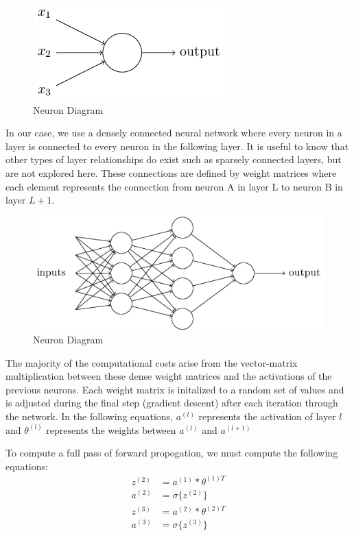 \documentclass[11pt]{article}
\begin{document}
\begin{figure}[H]
	\centering
	\includegraphics[scale=.5]{nn0.png}
	\caption{Neuron Diagram}
\end{figure}

In our case, we use a densely connected neural network where every neuron in a layer is connected to every neuron in the following layer. It is useful to know that other types of layer relationships do exist such as sparsely connected layers, but are not explored here. These connections are defined by weight matrices where each element represents the connection from neuron A in layer L to neuron B in layer $L+1$.

\begin{figure}[H]
	\centering
	\includegraphics[width=.45\textwidth]{nn1.png}
	\caption{Neuron Diagram}
\end{figure}

The majority of the computational costs arise from the vector-matrix multiplication between these dense weight matrices and the activations of the previous neurons. Each weight matrix is initalized to a random set of values and is adjusted during the final step (gradient descent) after each iteration through the network. In the following equations, $a^{(l)}$ represents the activation of layer $l$ and $\theta^{(l)}$ represents the weights between $a^{(l)}$ and $a^{(l+1)}$
 
To compute a full pass of forward propogation, we must compute the following equations:
\begin{align*}
	z^{(2)} & = a^{(1)}*\theta^{(1)T} \\
	a^{(2)} & = \sigma\{z^{(2)}\}     \\
	z^{(3)} & = a^{(2)}*\theta^{(2)T} \\
	a^{(3)} & = \sigma\{z^{(3)}\}
\end{align*}
\end{document}
